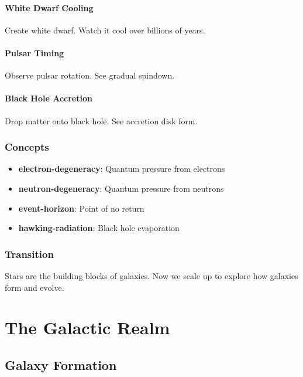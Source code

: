 \documentclass[
  11pt,
  letterpaper,
  twoside,
  openright]{book}
\providecommand{\tightlist}{%
  \setlength{\itemsep}{0pt}\setlength{\parskip}{0pt}}
\begin{document}
\subsection{White Dwarf Cooling}\label{white-dwarf-cooling}

Create white dwarf. Watch it cool over billions of years.

\subsection{Pulsar Timing}\label{pulsar-timing}

Observe pulsar rotation. See gradual spindown.

\subsection{Black Hole Accretion}\label{black-hole-accretion}

Drop matter onto black hole. See accretion disk form.

\section{Concepts}\label{concepts-23}

\begin{itemize}
\tightlist
\item
  \textbf{electron-degeneracy}: Quantum pressure from electrons
\item
  \textbf{neutron-degeneracy}: Quantum pressure from neutrons
\item
  \textbf{event-horizon}: Point of no return
\item
  \textbf{hawking-radiation}: Black hole evaporation
\end{itemize}

\section{Transition}\label{transition-23}

Stars are the building blocks of galaxies. Now we scale up to explore
how galaxies form and evolve.

\part{The Galactic Realm}

\chapter{Galaxy Formation}\label{sec-galaxy-formation}
\end{document}
